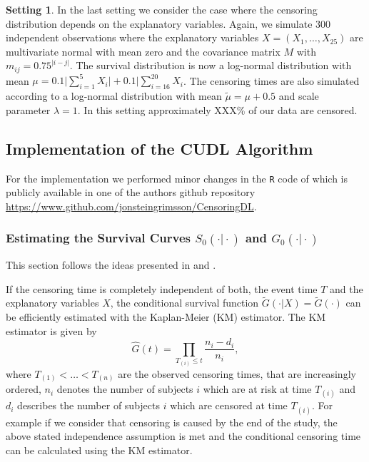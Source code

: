 \documentclass[12pt, a4paper]{article}
\theoremstyle{definition}
\newtheorem{setting}{Setting}
\theoremstyle{plain}
\numberwithin{equation}{section}
\numberwithin{figure}{section}
\numberwithin{table}{section}
\begin{document}
	\begin{setting}
		In the last setting we consider the case where the censoring distribution depends on the explanatory variables.
		Again, we simulate 300 independent observations where the explanatory variables $X=(X_1,\dots,X_{25})$ are multivariate normal with mean zero and the covariance matrix $M$ with $m_{ij}=0.75^{\vert i-j\vert}$.
		The survival distribution is now a log-normal distribution with mean $\mu = 0.1 \vert \sum_{i=1}^5 X_i \vert + 0.1 \vert \sum_{i=16}^{20}X_i$.
		The censoring times are also simulated according to a log-normal distribution with mean $\tilde{\mu}=\mu+0.5$ and scale parameter $\lambda = 1$.
		In this setting approximately XXX\% of our data are censored.
	\end{setting}
			
	\subsection{Implementation of the CUDL Algorithm}
	For the implementation we performed minor changes in the \texttt{R} code of \citet*{basearticle} which is publicly available in one of the authors github repository \url{https://www.github.com/jonsteingrimsson/CensoringDL}.
		
	\subsubsection{Estimating the Survival Curves $S_0(\cdot\vert\cdot)$ and $G_0(\cdot\vert\cdot)$}
	This section follows the ideas presented in \citet*{drcut} and \citet*{drtrees}.
	
	If the censoring time is completely independent of both, the event time $T$ and the explanatory variables $X$, the conditional survival function $\tilde{G}(\cdot\vert X)=\tilde{G}(\cdot)$ can be efficiently estimated with the Kaplan-Meier (KM) estimator.
	The KM estimator is given by
	\begin{equation*}
		\hat{G}(t) = \prod_{T_{(i)}\leq t} \frac{n_i-d_i}{n_i},
	\end{equation*}
	where $T_{(1)}<\dots<T_{(n)}$ are the observed censoring times, that are increasingly ordered, $n_i$ denotes the number of subjects $i$ which are at risk at time $T_{(i)}$ and $d_i$ describes the number of subjects $i$ which are censored at time $T_{(i)}$.
	For example if we consider that censoring is caused by the end of the study, the above stated independence assumption is met and the conditional censoring time can be calculated using the KM estimator.
	
\end{document}
